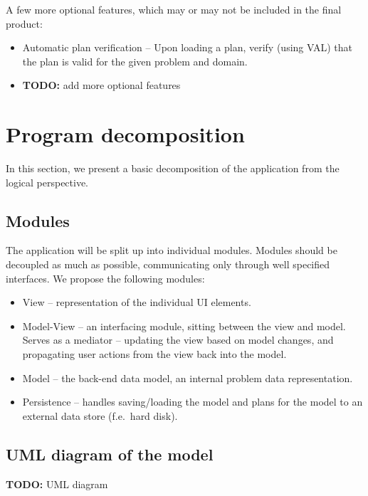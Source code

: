 \documentclass[10pt,a4paper,oneside]{article}
\newcommand{\TODO}[1]{{\textbf{TODO:} #1}} %
\begin{document}
A few more optional features, which may or may not be included in the final product:

\begin{itemize}
\item Automatic plan verification -- Upon loading a plan, verify (using VAL) that the plan is valid for the given problem and domain.
\item \TODO add more optional features
\end{itemize}









\section{Program decomposition}

In this section, we present a basic decomposition of the application from the logical perspective.

\subsection{Modules} \label{modules}

The application will be split up into individual modules.
Modules should be decoupled as much as possible, communicating only through well specified interfaces.
We propose the following modules:

\begin{itemize}
\item View -- representation of the individual UI elements.
\item Model-View -- an interfacing module, sitting between the view and model. Serves as a mediator -- updating the view based on model changes, and propagating user actions from the view back into the model.
\item Model -- the back-end data model, an internal problem data representation.
\item Persistence -- handles saving/loading the model and plans for the model to an external data store (f.e.~hard disk).
\end{itemize}

\subsection{UML diagram of the model}

\TODO UML diagram
 
\end{document}
